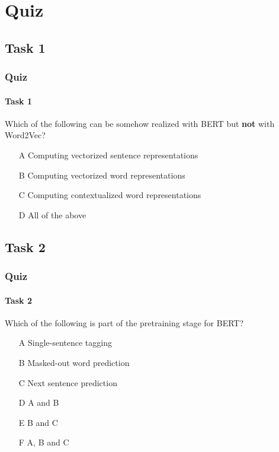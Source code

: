 \documentclass{beamer}
\begin{document}
\section{Quiz}
\subsection{Task 1}
\begin{frame}
    \frametitle{Quiz}
    \framesubtitle{Task 1}
    Which of the following can be somehow realized with BERT but \textbf{not} with Word2Vec?
    \begin{enumerate}
        \item[A] Computing vectorized sentence representations
        \item[B] Computing vectorized word representations
        \item[C] Computing contextualized word representations
        \item[D] All of the above
    \end{enumerate}
\end{frame}

\subsection{Task 2}
\begin{frame}
    \frametitle{Quiz}
    \framesubtitle{Task 2}
    Which of the following is part of the pretraining stage for BERT?
    \begin{enumerate}
        \item[A] Single-sentence tagging
        \item[B] Masked-out word prediction
        \item[C] Next sentence prediction
        \item[D] A and B
        \item[E] B and C
        \item[F] A, B and C
    \end{enumerate}
\end{frame}
%

%    
\end{document}
